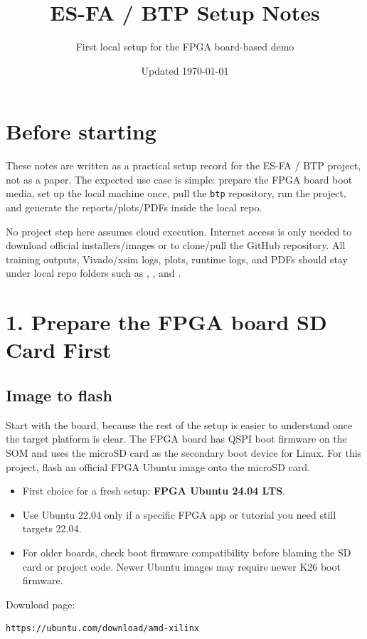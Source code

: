 \documentclass[11pt]{article}
\title{ES-FA / BTP Setup Notes}
\author{First local setup for the FPGA board-based demo}
\date{Updated \today}
\begin{document}
\maketitle

\section*{Before starting}
These notes are written as a practical setup record for the ES-FA / BTP project,
not as a paper. The expected use case is simple: prepare the FPGA board boot media,
set up the local machine once, pull the \texttt{btp} repository, run the project,
and generate the reports/plots/PDFs inside the local repo.

No project step here assumes cloud execution. Internet access is only needed to
download official installers/images or to clone/pull the GitHub repository. All
training outputs, Vivado/xsim logs, plots, runtime logs, and PDFs should stay
under local repo folders such as , , and
.

\section{1. Prepare the FPGA board SD Card First}
\subsection{Image to flash}
Start with the board, because the rest of the setup is easier to understand once
the target platform is clear. The FPGA board has QSPI boot firmware on the SOM and
uses the microSD card as the secondary boot device for Linux. For this project,
flash an official FPGA Ubuntu image onto the microSD card.

\begin{itemize}[leftmargin=*]
\item First choice for a fresh setup: \textbf{FPGA Ubuntu 24.04 LTS}.
\item Use Ubuntu 22.04 only if a specific FPGA app or tutorial you need still
targets 22.04.
\item For older boards, check boot firmware compatibility before blaming the SD
card or project code. Newer Ubuntu images may require newer K26 boot firmware.
\end{itemize}

Download page:
\begin{lstlisting}[style=cmd]
https://ubuntu.com/download/amd-xilinx
\end{lstlisting}
\end{document}

